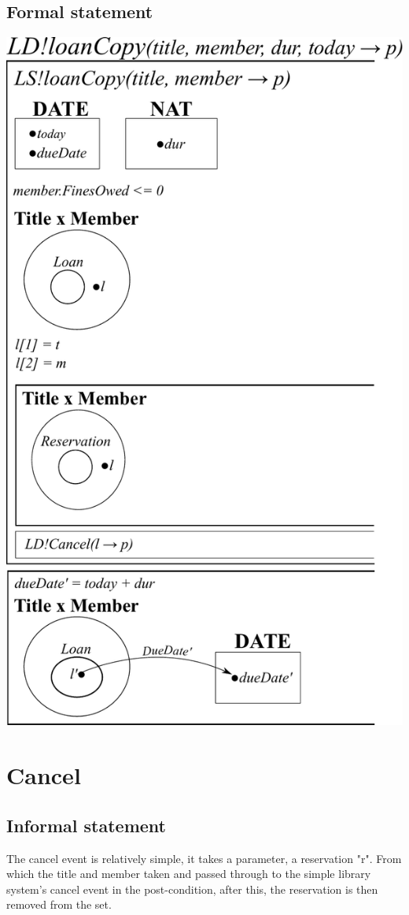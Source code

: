 \documentclass[]{report}
\begin{document}
\subsection{Formal statement}
\begin{center}
	\includegraphics[scale=0.75]{loan_copy.pdf}
\end{center}
\newpage
\section{Cancel}
\subsection{Informal statement}
The cancel event is relatively simple, it takes a parameter, a reservation "r". From which the title and member taken and passed through to the simple library system's cancel event in the post-condition, after this, the reservation is then removed from the set.
\end{document}
